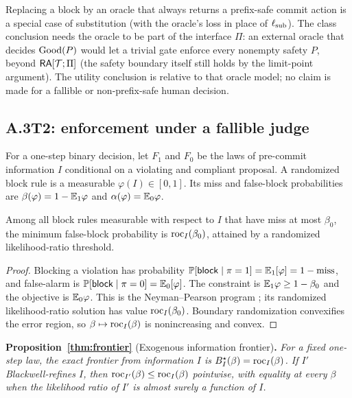 \begin{remark}[Escalation]
Replacing a block by an oracle that always returns a prefix-safe commit action is
a special case of substitution (with the oracle's loss in place of
$\ell_{\rm sub}$). The class conclusion needs the oracle to be part of the interface $\Pi$: an
external oracle that decides $\mathrm{Good}(P)$ would let a trivial gate enforce every nonempty safety $P$,
beyond $\mathsf{RA}[\mathcal{T};\Pi]$ (the safety boundary itself still holds by the limit-point argument). The
utility conclusion is relative to that oracle model; no claim is made for a fallible or
non-prefix-safe human decision.
\end{remark}

\subsection*{A.3\quad T2: enforcement under a fallible judge}
For a one-step binary decision, let $F_1$ and $F_0$ be the laws of pre-commit
information $I$ conditional on a violating and compliant proposal. A randomized
block rule is a measurable $\varphi(I)\in[0,1]$. Its miss and false-block
probabilities are $\beta(\varphi)=1-\mathbb{E}_1\varphi$ and
$\alpha(\varphi)=\mathbb{E}_0\varphi$.

\begin{lemma}\label{lem:np}
Among all block rules measurable with respect to $I$ that have miss at most $\beta_0$, the minimum
false-block probability is $\mathrm{roc}_I(\beta_0)$, attained by a randomized
likelihood-ratio threshold.
\end{lemma}
\begin{proof}
Blocking a violation has probability $\mathbb{P}[\mathsf{block}\mid\pi=1]=\mathbb{E}_1[\varphi]
=1-\text{miss}$, and false-alarm is $\mathbb{P}[\mathsf{block}\mid\pi=0]=\mathbb{E}_0[\varphi]$.
The constraint is $\mathbb{E}_1\varphi\ge1-\beta_0$ and the objective is
$\mathbb{E}_0\varphi$. This is the Neyman--Pearson
program \citep{neyman1933problem,tong2018np}; its randomized likelihood-ratio
solution has value $\mathrm{roc}_I(\beta_0)$. Boundary randomization convexifies the
error region, so $\beta\mapsto\mathrm{roc}_I(\beta)$ is nonincreasing and convex.
\end{proof}

\noindent\textbf{Proposition~\ref{thm:frontier}} (Exogenous information frontier)\textbf{.}
\emph{For a fixed one-step law, the exact frontier from information $I$ is
$B_I^\star(\beta)=\mathrm{roc}_I(\beta)$. If $I'$ Blackwell-refines $I$, then
$\mathrm{roc}_{I'}(\beta)\le\mathrm{roc}_I(\beta)$ pointwise, with equality at every $\beta$ when the
likelihood ratio of $I'$ is almost surely a function of $I$.}

